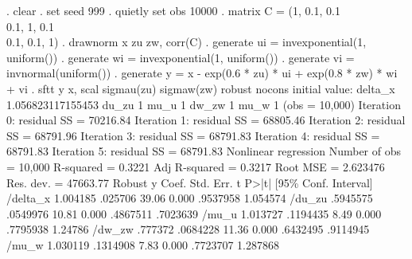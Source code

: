. clear
{\smallskip}
. set seed 999
{\smallskip}
. quietly set obs 10000
{\smallskip}
. matrix C = (1, 0.1, 0.1 \\ 0.1, 1, 0.1 \\ 0.1, 0.1, 1)
{\smallskip}
. drawnorm x zu zw, corr(C)
{\smallskip}
. generate ui = invexponential(1, uniform())
{\smallskip}
. generate wi = invexponential(1, uniform())
{\smallskip}
. generate vi = invnormal(uniform())
{\smallskip}
. generate y = x - exp(0.6 * zu) * ui + exp(0.8 * zw) * wi + vi
{\smallskip}
. sftt y x, scal sigmau(zu) sigmaw(zw) robust nocons
initial value: delta_x 1.056823117155453 du_zu 1 mu_u 1 dw_zw 1 mu_w 1
(obs = 10,000)
{\smallskip}
Iteration 0:  residual SS =  70216.84
Iteration 1:  residual SS =  68805.46
Iteration 2:  residual SS =  68791.96
Iteration 3:  residual SS =  68791.83
Iteration 4:  residual SS =  68791.83
Iteration 5:  residual SS =  68791.83
{\smallskip}
{\smallskip}
Nonlinear regression                                Number of obs =     10,000
                                                    R-squared     =     0.3221
                                                    Adj R-squared =     0.3217
                                                    Root MSE      =   2.623476
                                                    Res. dev.     =   47663.77
{\smallskip}
{}
             {\VBAR}               Robust
           y {\VBAR}      Coef.   Std. Err.      t    P>|t|     [95\% Conf. Interval]
    /delta_x {\VBAR}   1.004185    .025706    39.06   0.000     .9537958    1.054574
      /du_zu {\VBAR}   .5945575   .0549976    10.81   0.000     .4867511    .7023639
       /mu_u {\VBAR}   1.013727   .1194435     8.49   0.000     .7795938     1.24786
      /dw_zw {\VBAR}    .777372   .0684228    11.36   0.000     .6432495    .9114945
       /mu_w {\VBAR}   1.030119   .1314908     7.83   0.000     .7723707    1.287868
